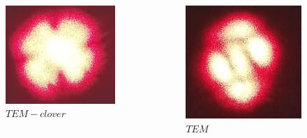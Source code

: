 \documentclass{beamer}
\begin{document}
\begin{frame}
		\vspace{-10pt}
		
		\begin{columns}
			\begin{column}{0.32\textwidth}
				\begin{figure}
					\centering
					\includegraphics[width=0.8\linewidth]{res/tem_strange_2.png}
					\caption{\footnotesize$TEM-clover$ }
				\end{figure}
			\end{column}
			\begin{column}{0.3\textwidth}
				\begin{figure}
					\centering
					\includegraphics[width=0.8\linewidth]{res/tem_strange_1.png}
					\caption{\footnotesize $TEM$}
				\end{figure}
			\end{column}
		\end{columns}	
	\end{frame}
	
\end{document}
